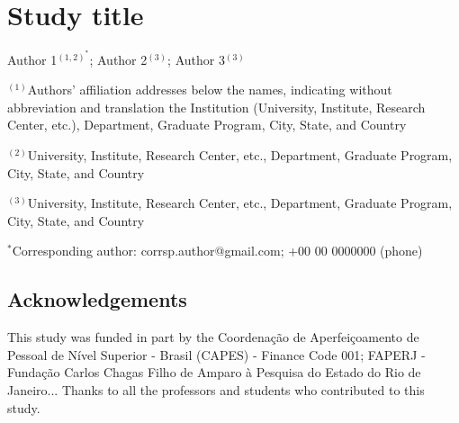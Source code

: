 \documentclass[a4paper,12pt,twoside]{report}
\begin{document}
\thispagestyle{empty}

\section*{Study title}


Author 1$^{(1,2)^*}$;  
Author 2$^{(3)}$; 
Author 3$^{(3)}$


\vspace{.4cm}

$^{(1)}$Authors’ affiliation addresses below the names, indicating without abbreviation and translation the Institution (University, Institute, Research Center, etc.), Department, Graduate Program, City, State, and Country

$^{(2)}$University, Institute, Research Center, etc., Department, Graduate Program, City, State, and Country

$^{(3)}$University, Institute, Research Center, etc., Department, Graduate Program, City, State, and Country

\vspace{.4cm}

$^{*}$Corresponding author: 
corrsp.author@gmail.com; 
+00 00 0000000 (phone)

\subsection*{Acknowledgements}
This study was funded in part by the Coordenação de Aperfeiçoamento de Pessoal de Nível Superior - Brasil (CAPES) - Finance Code 001; FAPERJ - Fundação Carlos Chagas Filho de Amparo à Pesquisa do Estado do Rio de Janeiro... Thanks to all the professors and students who contributed to this study. 
\end{document}
